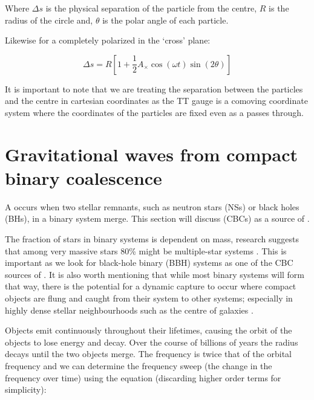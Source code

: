 Where $\Delta s$ is the physical separation of the particle from the centre, $R$ is the radius of the circle and, $\theta$ is the polar angle of each particle.

Likewise for a \gw completely polarized in the `cross' plane:

\begin{equation}
   \Delta s = R[1 + \frac{1}{2} A_{\times} \cos(\omega t) \sin(2 \theta)]
   \label{eqn:cross_separation}
\end{equation}

It is important to note that we are treating the separation between the particles and the centre in cartesian coordinates as the TT gauge is a comoving coordinate system where the coordinates of the particles are fixed
even as a \gw passes through.

\section{\label{sec:CBC}Gravitational waves from compact binary coalescence}


A \cbc occurs when two stellar remnants, such as neutron stars (NSs) or black holes (BHs), in a binary system merge. This section will discuss \cbcs (CBCs) as a source of \gws.

The fraction of stars in binary systems is dependent on mass, research suggests that among very massive stars 80\% might be multiple-star systems \cite{binary_fraction:2006}. This is important as we look for black-hole binary (BBH) systems as one of the CBC sources of \gws. It is also worth mentioning that while most binary systems will form that way, there is the potential for a dynamic capture to occur where compact objects are flung and caught from
their system to other systems; especially in highly dense stellar neighbourhoods such as the centre of galaxies \cite{dynamic_capture:2000}.

Objects emit \gws continuously throughout their lifetimes, causing the orbit of the objects to lose energy and decay. Over the course of billions of years the radius decays until the two objects merge. The \gw frequency is twice that of the orbital frequency \cite{kip_book} and we can determine the frequency sweep (the change in the frequency over time) using the equation (discarding higher order terms for simplicity):

